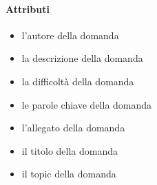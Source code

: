 \paragraph{Attributi}
\begin{itemize}
\item {}
\newline
l'autore della domanda
\item {}
\newline
la descrizione della domanda
\item {}
\newline
la difficoltà della domanda
\item {}
\newline
le parole chiave della domanda
\item {}
\newline
l'allegato della domanda
\item {}
\newline
il titolo della domanda
\item {}
\newline
il topic della domanda
\end{itemize}
